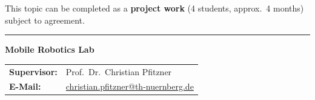 \documentclass{ohm_project_description}
\begin{document}
\vspace{0.5cm}
This topic can be completed as a \textbf{project work} (4 students, approx.\ 4 months)
subject to agreement.

\vfill
\textcolor{ohm_red}{\rule{\linewidth}{0.4mm}}
\textbf{\textcolor{ohm_red}{Mobile Robotics Lab}} \\
\begin{tabular}{@{}ll}
\textbf{Supervisor:} & Prof.\ Dr.\ Christian Pfitzner \\
\textbf{E-Mail:}     & \href{mailto:christian.pfitzner@th-nuernberg.de}{christian.pfitzner@th-nuernberg.de} \\
\end{tabular}
\end{document}
